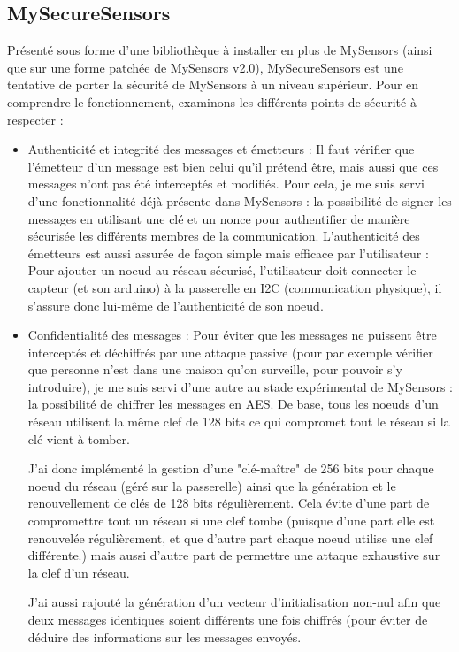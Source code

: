 \documentclass[12 pt]{report}
\begin{document}
\begin{appendix}
\section{MySecureSensors}
Présenté sous forme d'une bibliothèque à installer en plus de MySensors (ainsi que sur une forme patchée de MySensors v2.0), MySecureSensors est une tentative de porter la sécurité de MySensors à un niveau supérieur. Pour en comprendre le fonctionnement, examinons les différents points de sécurité à respecter :
\begin{itemize}
\item Authenticité et integrité des messages et émetteurs : Il faut vérifier que l'émetteur d'un message est bien celui qu'il prétend être, mais aussi que ces messages n'ont pas été interceptés et modifiés. Pour cela, je me suis servi d'une fonctionnalité déjà présente dans MySensors : la possibilité de signer les messages en utilisant une clé et un nonce pour authentifier de manière sécurisée les différents membres de la communication.
\newpage
L'authenticité des émetteurs est aussi assurée de façon simple mais efficace par l'utilisateur : Pour ajouter un noeud au réseau sécurisé, l'utilisateur doit connecter le capteur (et son arduino) à la passerelle en I2C (communication physique), il s'assure donc lui-même de l'authenticité de son noeud.\\
\item Confidentialité des messages : Pour éviter que les messages ne puissent être interceptés et déchiffrés par une attaque passive (pour par exemple vérifier que personne n'est dans une maison qu'on surveille, pour pouvoir s'y introduire), je me suis servi d'une autre au stade expérimental de MySensors : la possibilité de chiffrer les messages en AES. De base, tous les noeuds d'un réseau utilisent la même clef de 128 bits ce qui compromet tout le réseau si la clé vient à tomber. 

J'ai donc implémenté la gestion d'une "clé-maître" de 256 bits pour chaque noeud du réseau (géré sur la passerelle) ainsi que la génération et le renouvellement de clés de 128 bits régulièrement. Cela évite d'une part de compromettre tout un réseau si une clef tombe (puisque d'une part elle est renouvelée régulièrement, et que d'autre part chaque noeud utilise une clef différente.) mais aussi d'autre part de permettre une attaque exhaustive sur la clef d'un réseau. 

J'ai aussi rajouté la génération d'un vecteur d'initialisation non-nul afin que deux messages identiques soient différents une fois chiffrés (pour éviter de déduire des informations sur les messages envoyés.


\end{itemize}
\end{appendix}
\end{document}
